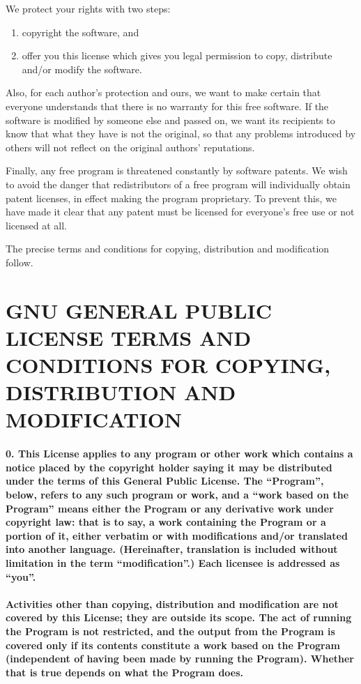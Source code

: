 \documentclass[english,letterpaper]{book}
\begin{document}
We protect your rights with two steps:

\begin{enumerate}
   \item copyright the software, and
   \item offer you this license which gives you legal permission to copy, distribute
      and/or modify the software.
\end{enumerate}

Also, for each author's protection and ours, we want to make certain
that everyone understands that there is no warranty for this free
software. If the software is modified by someone else and passed on,
we want its recipients to know that what they have is not the original,
so that any problems introduced by others will not reflect on the
original authors' reputations.

Finally, any free program is threatened constantly by software patents.
We wish to avoid the danger that redistributors of a free program
will individually obtain patent licenses, in effect making the program
proprietary. To prevent this, we have made it clear that any patent
must be licensed for everyone's free use or not licensed at all.

The precise terms and conditions for copying, distribution and modification
follow.


\section*{GNU GENERAL PUBLIC LICENSE TERMS AND CONDITIONS FOR COPYING, DISTRIBUTION
AND MODIFICATION}


\paragraph{0. This License applies to any program or other work which contains
a notice placed by the copyright holder saying it may be distributed
under the terms of this General Public License. The ``Program'',
below, refers to any such program or work, and a ``work based
on the Program'' means either the Program or any derivative
work under copyright law: that is to say, a work containing the Program
or a portion of it, either verbatim or with modifications and/or translated
into another language. (Hereinafter, translation is included without
limitation in the term ``modification''.) Each licensee
is addressed as ``you''.}


\paragraph{Activities other than copying, distribution and modification are
not covered by this License; they are outside its scope. The act of
running the Program is not restricted, and the output from the Program
is covered only if its contents constitute a work based on the Program
(independent of having been made by running the Program). Whether
that is true depends on what the Program does.}
\end{document}
